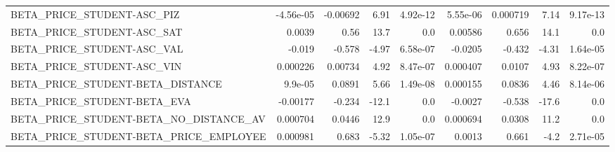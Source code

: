 \begin{tabular}{lrrrrrrrr}
BETA\_PRICE\_STUDENT-ASC\_PIZ              &   -4.56e-05 &     -0.00692 &    6.91 & 4.92e-12 &   5.55e-06 &    0.000719 &         7.14 &      9.17e-13 \\
BETA\_PRICE\_STUDENT-ASC\_SAT              &      0.0039 &         0.56 &    13.7 &      0.0 &    0.00586 &       0.656 &         14.1 &           0.0 \\
BETA\_PRICE\_STUDENT-ASC\_VAL              &      -0.019 &       -0.578 &   -4.97 & 6.58e-07 &    -0.0205 &      -0.432 &        -4.31 &      1.64e-05 \\
BETA\_PRICE\_STUDENT-ASC\_VIN              &    0.000226 &      0.00734 &    4.92 & 8.47e-07 &   0.000407 &      0.0107 &         4.93 &      8.22e-07 \\
BETA\_PRICE\_STUDENT-BETA\_DISTANCE        &     9.9e-05 &       0.0891 &    5.66 & 1.49e-08 &   0.000155 &      0.0836 &         4.46 &      8.14e-06 \\
BETA\_PRICE\_STUDENT-BETA\_EVA             &    -0.00177 &       -0.234 &   -12.1 &      0.0 &    -0.0027 &      -0.538 &        -17.6 &           0.0 \\
BETA\_PRICE\_STUDENT-BETA\_NO\_DISTANCE\_AV  &    0.000704 &       0.0446 &    12.9 &      0.0 &   0.000694 &      0.0308 &         11.2 &           0.0 \\
BETA\_PRICE\_STUDENT-BETA\_PRICE\_EMPLOYEE  &    0.000981 &        0.683 &   -5.32 & 1.05e-07 &     0.0013 &       0.661 &         -4.2 &      2.71e-05 \\
\bottomrule
\end{tabular}
